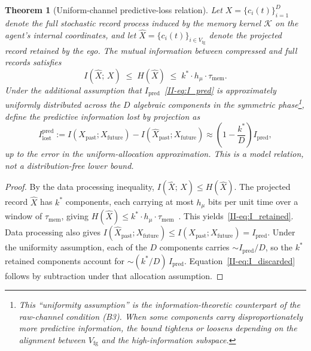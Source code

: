 \documentclass[12pt,a4paper,openany]{book}
\newtheorem{theorem}{Theorem}[chapter]
\begin{document}
\begin{theorem}[Uniform-channel predictive-loss relation]
\label{II-thm:tradeoff}
Let $X = \{c_i(t)\}_{i=1}^{D}$ denote the full stochastic
record process induced by the memory kernel $\mathcal{K}$
on the agent's internal coordinates, and let
$\hat{X} = \{c_i(t)\}_{i \in V_{\mathrm{fg}}}$ denote the
projected record retained by the ego.
The mutual information between compressed and full records satisfies
\begin{equation}
\label{II-eq:I_retained}
I(\hat{X};\,X) \;\leq\; H(\hat{X})
\;\leq\; k^* \cdot h_\mu \cdot \tau_{\mathrm{mem}}.
\end{equation}
Under the additional assumption that
$I_{\mathrm{pred}}$~\eqref{II-eq:I_pred} is approximately
uniformly distributed across the $D$ algebraic components
in the symmetric phase\footnote{%
This ``uniformity assumption'' is the information-theoretic
counterpart of the raw-channel condition (B3).
When some components carry disproportionately more predictive
information, the bound tightens or loosens depending on the
alignment between $V_{\mathrm{fg}}$ and the high-information
subspace.},
define the predictive information lost by projection as
\begin{equation}
\label{II-eq:I_discarded}
I_{\mathrm{lost}}^{\mathrm{pred}}
:= I(X_{\mathrm{past}};X_{\mathrm{future}})
-I(\hat X_{\mathrm{past}};X_{\mathrm{future}})
\approx \left(1 - \frac{k^*}{D}\right) I_{\mathrm{pred}},
\end{equation}
up to the error in the uniform-allocation approximation.  This is a
model relation, not a distribution-free lower bound.
\end{theorem}

\begin{proof}
By the data processing inequality,
$I(\hat{X};\,X) \leq H(\hat{X})$.
The projected record $\hat{X}$ has $k^*$ components,
each carrying at most $h_\mu$ bits per unit time over a
window of $\tau_{\mathrm{mem}}$, giving
$H(\hat{X}) \leq k^* \cdot h_\mu \cdot
\tau_{\mathrm{mem}}$~\cite{CoverThomas2006}.
This yields~\eqref{II-eq:I_retained}.
Data processing also gives
$I(\hat X_{\mathrm{past}};X_{\mathrm{future}})\leq
I(X_{\mathrm{past}};X_{\mathrm{future}})=I_{\mathrm{pred}}$.
Under the uniformity assumption, each of the $D$ components
carries $\sim I_{\mathrm{pred}}/D$, so the $k^*$ retained
components account for $\sim (k^*/D)\,I_{\mathrm{pred}}$.
Equation~\eqref{II-eq:I_discarded} follows by subtraction under that
allocation assumption.
\end{proof}
\end{document}
